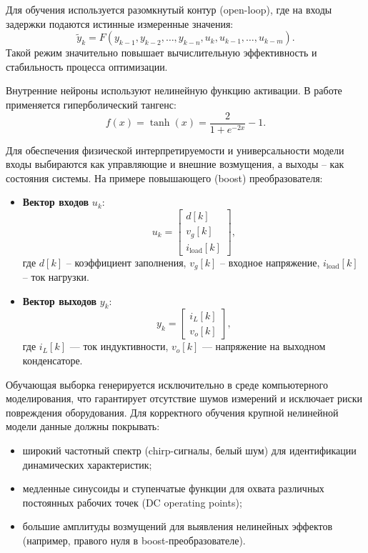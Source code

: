 Для обучения используется разомкнутый контур (open-loop), где на входы задержки подаются истинные измеренные значения:
\begin{equation}
    \tilde{y}_k = F(y_{k-1}, y_{k-2}, \dots, y_{k-n}, u_k, u_{k-1}, \dots, u_{k-m}).
\end{equation}
Такой режим значительно повышает вычислительную эффективность и стабильность процесса оптимизации.

Внутренние нейроны используют нелинейную функцию активации. В работе применяется гиперболический тангенс:
\begin{equation}
    f(x) = \tanh(x) = \frac{2}{1+e^{-2x}} - 1.
\end{equation}

Для обеспечения физической интерпретируемости и универсальности модели входы выбираются как управляющие и внешние возмущения, а выходы -- как состояния системы. На примере повышающего (boost) преобразователя:
\begin{itemize}[leftmargin=*]
    \item \textbf{Вектор входов} $u_k$:
    \begin{equation}
        u_k = \begin{bmatrix} d[k] \\ v_g[k] \\ i_{\text{load}}[k] \end{bmatrix},
    \end{equation}
    где $d[k]$ -- коэффициент заполнения, $v_g[k]$ -- входное напряжение, $i_{\text{load}}[k]$ -- ток нагрузки.
    \item \textbf{Вектор выходов} $y_k$:
    \begin{equation}
        y_k = \begin{bmatrix} i_L[k] \\ v_o[k] \end{bmatrix},
    \end{equation}
    где $i_L[k]$ --- ток индуктивности, $v_o[k]$ --- напряжение на выходном конденсаторе.
\end{itemize}

Обучающая выборка генерируется исключительно в среде компьютерного моделирования, что гарантирует отсутствие шумов измерений и исключает риски повреждения оборудования. Для корректного обучения крупной нелинейной модели данные должны покрывать:
\begin{itemize}
    \item широкий частотный спектр (chirp-сигналы, белый шум) для идентификации динамических характеристик;
    \item медленные синусоиды и ступенчатые функции для охвата различных постоянных рабочих точек (DC operating points);
    \item большие амплитуды возмущений для выявления нелинейных эффектов (например, правого нуля в boost-преобразователе).
\end{itemize}

